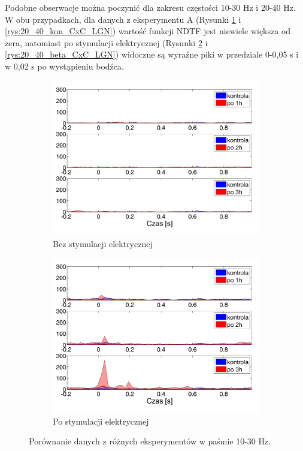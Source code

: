 \documentclass{pracamgr_2}
\begin{document}
\FloatBarrier
Podobne obserwacje można poczynić dla zakresu częstości 10-30 Hz i 20-40 Hz. W obu przypadkach, dla danych z eksperymentu A (Rysunki \ref{rys:10_30_kon_CxC_LGN} i \ref{rys:20_40_kon_CxC_LGN}) wartość funkcji NDTF jest niewiele większa od zera, natomiast po stymulacji elektrycznej (Rysunki \ref{rys:10_30_beta_CxC_LGN} i \ref{rys:20_40_beta_CxC_LGN}) widoczne są wyraźne piki w przedziale 0-0,05 s i w 0,02 s po wystąpieniu bodźca. 
\begin{figure}[h]
	\begin{subfigure}{.5\textwidth}
		\centering
		\includegraphics[width=1.\linewidth]{kontrola15_10-30_z_CxC8_do_LGN8.png}
		\caption{Bez stymulacji elektrycznej}
		\label{rys:10_30_kon_CxC_LGN}
	\end{subfigure}%
	\begin{subfigure}{.5\textwidth}
		\centering
		\includegraphics[width=1.\linewidth]{beta3_10-30_z_CxC5_do_LGN4.png}
		\caption{Po stymulacji elektrycznej}
		\label{rys:10_30_beta_CxC_LGN}
	\end{subfigure}
	\caption{Porównanie danych z różnych eksperymentów w paśmie 10-30 Hz.}
	\label{rys:10_30_CxC_LGN}
\end{figure}
\end{document}
